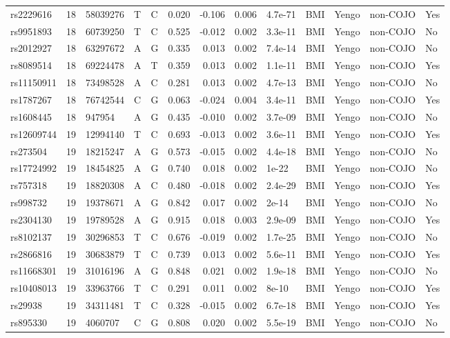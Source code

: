 \documentclass[11pt,twoside]{bristolthesis}
\begin{document}
\begin{longtable}[t]{lrlllrrrlllll}
rs2229616 & 18 & 58039276 & T & C & 0.020 & -0.106 & 0.006 & 4.7e-71 & BMI & Yengo & non-COJO & Yes\\
\addlinespace
rs9951893 & 18 & 60739250 & T & C & 0.525 & -0.012 & 0.002 & 3.3e-11 & BMI & Yengo & non-COJO & No\\
rs2012927 & 18 & 63297672 & A & G & 0.335 & 0.013 & 0.002 & 7.4e-14 & BMI & Yengo & non-COJO & No\\
rs8089514 & 18 & 69224478 & A & T & 0.359 & 0.013 & 0.002 & 1.1e-11 & BMI & Yengo & non-COJO & Yes\\
rs11150911 & 18 & 73498528 & A & C & 0.281 & 0.013 & 0.002 & 4.7e-13 & BMI & Yengo & non-COJO & No\\
rs1787267 & 18 & 76742544 & C & G & 0.063 & -0.024 & 0.004 & 3.4e-11 & BMI & Yengo & non-COJO & Yes\\
\addlinespace
rs1608445 & 18 & 947954 & A & G & 0.435 & -0.010 & 0.002 & 3.7e-09 & BMI & Yengo & non-COJO & No\\
rs12609744 & 19 & 12994140 & T & C & 0.693 & -0.013 & 0.002 & 3.6e-11 & BMI & Yengo & non-COJO & Yes\\
rs273504 & 19 & 18215247 & A & G & 0.573 & -0.015 & 0.002 & 4.4e-18 & BMI & Yengo & non-COJO & No\\
rs17724992 & 19 & 18454825 & A & G & 0.740 & 0.018 & 0.002 & 1e-22 & BMI & Yengo & non-COJO & No\\
rs757318 & 19 & 18820308 & A & C & 0.480 & -0.018 & 0.002 & 2.4e-29 & BMI & Yengo & non-COJO & Yes\\
\addlinespace
rs998732 & 19 & 19378671 & A & G & 0.842 & 0.017 & 0.002 & 2e-14 & BMI & Yengo & non-COJO & No\\
rs2304130 & 19 & 19789528 & A & G & 0.915 & 0.018 & 0.003 & 2.9e-09 & BMI & Yengo & non-COJO & Yes\\
rs8102137 & 19 & 30296853 & T & C & 0.676 & -0.019 & 0.002 & 1.7e-25 & BMI & Yengo & non-COJO & No\\
rs2866816 & 19 & 30683879 & T & C & 0.739 & 0.013 & 0.002 & 5.6e-11 & BMI & Yengo & non-COJO & Yes\\
rs11668301 & 19 & 31016196 & A & G & 0.848 & 0.021 & 0.002 & 1.9e-18 & BMI & Yengo & non-COJO & No\\
\addlinespace
rs10408013 & 19 & 33963766 & T & C & 0.291 & 0.011 & 0.002 & 8e-10 & BMI & Yengo & non-COJO & Yes\\
rs29938 & 19 & 34311481 & T & C & 0.328 & -0.015 & 0.002 & 6.7e-18 & BMI & Yengo & non-COJO & Yes\\
rs895330 & 19 & 4060707 & C & G & 0.808 & 0.020 & 0.002 & 5.5e-19 & BMI & Yengo & non-COJO & No\\

\end{longtable}
\end{document}
